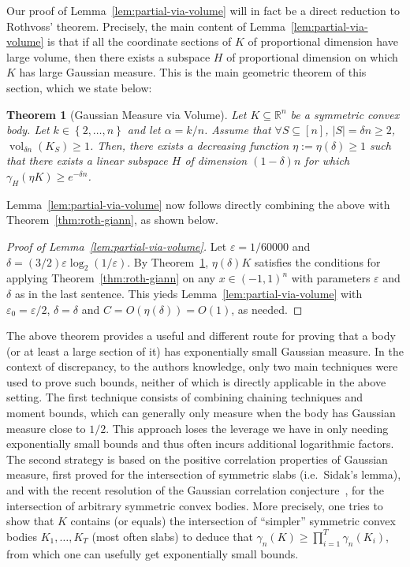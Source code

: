 \documentclass[12pt]{article}
\newtheorem{theorem}{Theorem}
\newcommand{\R}{{\mathbb{R}}}
\newcommand\eps{\varepsilon}
\newcommand{\set}[1]{\left\{ #1 \right\}}
\DeclareMathOperator{\vol}{vol}
\begin{document}
Our proof of Lemma~\ref{lem:partial-via-volume} will in fact be a direct
reduction to Rothvoss' theorem. Precisely, the main content of
Lemma~\ref{lem:partial-via-volume} is that if all the coordinate sections of $K$
of proportional dimension have large volume, then there exists a subspace $H$ of
proportional dimension on which $K$ has large Gaussian measure. This is the main
geometric theorem of this section, which we state below: 

\begin{theorem}[Gaussian Measure via Volume]
\label{thm:gauss-via-volume}
Let $K \subseteq \R^n$ be a symmetric convex body. Let $k \in \set{2,\dots,n}$ and
let $\alpha = k/n$. Assume that $\forall S \subseteq [n]$, $|S| = \delta n \geq
2$, $\vol_{\delta n}(K_S) \geq 1$. Then, there exists a decreasing function
$\eta := \eta(\delta) \geq 1$ such that there exists a linear subspace $H$ of
dimension $(1-\delta)n$ for which $\gamma_H(\eta K) \geq e^{-\delta n}$.
\end{theorem}

Lemma~\ref{lem:partial-via-volume} now follows directly combining the above with
Theorem~\ref{thm:roth-giann}, as shown below.

\begin{proof}[Proof of Lemma~\ref{lem:partial-via-volume}] 
Let $\eps = 1/60000$ and $\delta = (3/2) \eps \log_2(1/\eps)$. By
Theorem~\ref{thm:gauss-via-volume}, $\eta(\delta) K$ satisfies the conditions
for applying Theorem~\ref{thm:roth-giann} on any $x \in (-1,1)^n$ with
parameters $\eps$ and $\delta$ as in the last sentence. This yieds
Lemma~\ref{lem:partial-via-volume} with $\eps_0 = \eps/2$, $\delta = \delta$ and
$C = O(\eta(\delta)) = O(1)$, as needed.   
\end{proof}

The above theorem provides a useful and different route for proving that a body
(or at least a large section of it) has exponentially small Gaussian measure. In
the context of discrepancy, to the authors knowledge, only two main techniques
were used to prove such bounds, neither of which is directly applicable in the above
setting. The first technique consists of combining chaining techniques and
moment bounds, which can generally only measure when the body has Gaussian
measure close to $1/2$.  This approach loses the leverage we have in only
needing exponentially small bounds and thus often incurs additional
logarithmic factors. The second strategy is based on the positive correlation
properties of Gaussian measure, first proved for the intersection of symmetric
slabs (i.e.~Sidak's lemma), and with the recent resolution of the Gaussian
correlation conjecture~\cite{Royen14}, for the intersection of arbitrary
symmetric convex bodies. More precisely, one tries to show that $K$ contains (or
equals) the intersection of ``simpler'' symmetric convex bodies $K_1,\dots,K_T$
(most often slabs) to deduce that $\gamma_n(K) \geq \prod_{i=1}^T
\gamma_n(K_i)$, from which one can usefully get exponentially small bounds.
\end{document}
